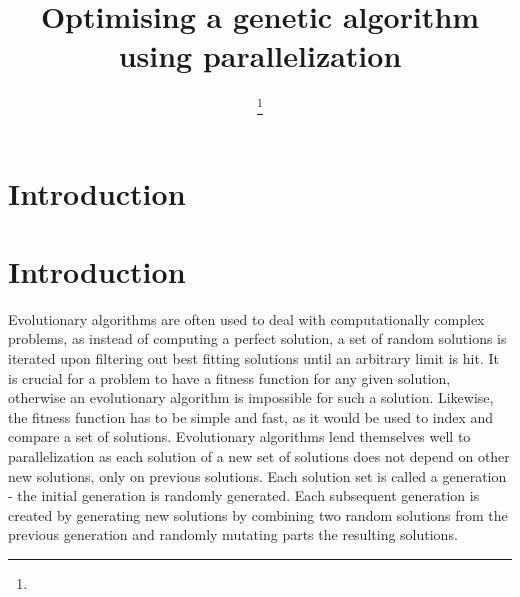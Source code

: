 \documentclass[journal,transmag]{IEEEtran}
\begin{document}
\title{Optimising a genetic algorithm using parallelization}

\author{

\thanks{}}




\maketitle

\IEEEdisplaynontitleabstractindextext

\IEEEpeerreviewmaketitle

\section{Introduction}
 

\section{Introduction}%
	Evolutionary algorithms are often used to deal with computationally complex problems,
        as instead of computing a perfect solution, a set of random solutions is iterated upon
        filtering out best fitting solutions until an arbitrary limit is hit. It is crucial for
        a problem to have a fitness function for any given solution, otherwise an evolutionary
        algorithm is impossible for such a solution. Likewise, the fitness function has to be
        simple and fast, as it would be used to index and compare a set of solutions. Evolutionary
        algorithms lend themselves well to parallelization as each solution of a new set of solutions
        does not depend on other new solutions, only on previous solutions. Each solution set is called
        a generation - the initial generation is randomly generated. Each subsequent generation
        is created by generating new solutions by combining two random solutions from the previous
        generation and randomly mutating parts the resulting solutions.
        
\end{document}
